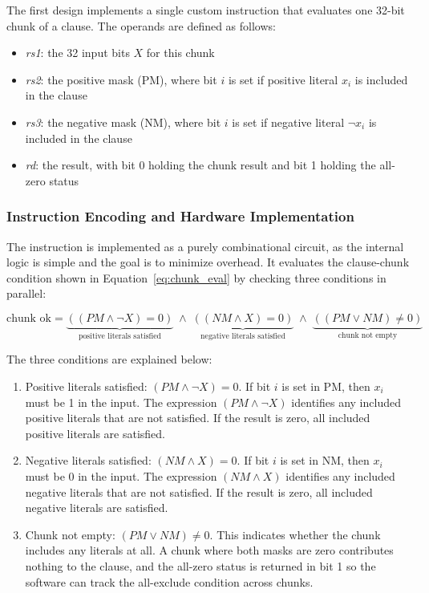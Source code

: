 The first design implements a single custom instruction that evaluates one 32-bit chunk of a clause. The
operands are defined as follows:

\begin{itemize}
    \item \textit{rs1}: the 32 input bits $X$ for this chunk
    \item \textit{rs2}: the positive mask (PM), where bit $i$ is set if positive
    literal $x_i$ is included in the clause
    \item \textit{rs3}: the negative mask (NM), where bit $i$ is set if negative
    literal $\lnot x_i$ is included in the clause
    \item \textit{rd}: the result, with bit 0 holding the chunk result and bit 1
    holding the all-zero status
\end{itemize}

\subsubsection{Instruction Encoding and Hardware Implementation}
\label{sec:cfu_design1_logic}

The instruction is implemented as a purely combinational circuit, as the
internal logic is simple and the goal is to minimize overhead. It evaluates the
clause-chunk condition shown in Equation~\eqref{eq:chunk_eval} by checking three
conditions in parallel:

\begin{equation}
\text{chunk ok} = \underbrace{((PM \land \lnot X) = 0)}_{\text{positive literals satisfied}}
\;\land\; \underbrace{((NM \land X) = 0)}_{\text{negative literals satisfied}}
\;\land\; \underbrace{((PM \lor NM) \neq 0)}_{\text{chunk not empty}}
\label{eq:chunk_eval}
\end{equation}

The three conditions are explained below:

\begin{enumerate}
    \item Positive literals satisfied: $(PM \land \lnot X) = 0$. If bit $i$ is
    set in PM, then $x_i$ must be 1 in the input. The expression
    $(PM \land \lnot X)$ identifies any included positive literals that are not
    satisfied. If the result is zero, all included positive literals are
    satisfied.

    \item Negative literals satisfied: $(NM \land X) = 0$. If bit $i$ is set in
    NM, then $x_i$ must be 0 in the input. The expression $(NM \land X)$
    identifies any included negative literals that are not satisfied. If the
    result is zero, all included negative literals are satisfied.

    \item Chunk not empty: $(PM \lor NM) \neq 0$. This indicates whether the
    chunk includes any literals at all. A chunk where both masks are zero
    contributes nothing to the clause, and the all-zero status is returned in
    bit 1 so the software can track the all-exclude condition across chunks.
\end{enumerate}

